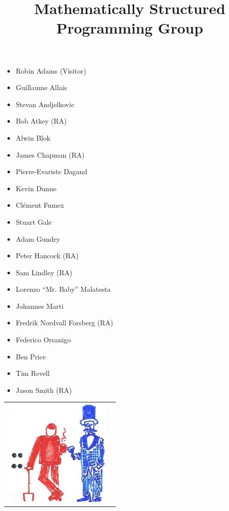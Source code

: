 \documentclass{article}
\begin{document}
\title{\Huge \textbf{Mathematically Structured Programming Group}}

\date{}
\maketitle
\thispagestyle{empty} %

\begin{center}

\begin{multicols}{2}
\large
\begin{itemize}
  \item Robin Adams (Visitor)
  \item Guillaume Allais
  \item Stevan Andjelkovic
  \item Bob Atkey (RA)
  \item Alwin Blok
  \item James Chapman (RA)
  \item Pierre-Evariste Dagand
  \item Kevin Dunne
  \item Cl\'{e}ment Fumex
  \item Stuart Gale
  \item Adam Gundry
  \item Peter Hancock (RA)
  \item Sam Lindley (RA)
  \item Lorenzo ``Mr. Baby'' Malatesta
  \item Johannes Marti
  \item Fredrik Nordvall Forsberg (RA)
  \item Federico Orsanigo
  \item Ben Price
  \item Tim Revell
  \item Jason Smith (RA)
\end{itemize}
\end{multicols}
\vskip 3cm
\end{center}

\begin{tabular}{l r}
\hskip 1cm
\includegraphics[scale=0.65]{semicolon.png} &
\end{tabular}
\end{document}
